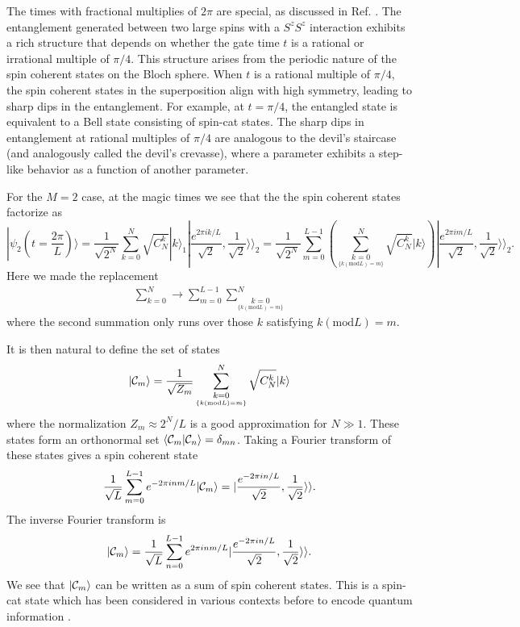 \documentclass{WileyMSP-template}
\begin{document}
The times with fractional multiplies of $ 2 \pi  $ are special, as discussed in Ref. \cite{byrnes2013fractality}.  The entanglement generated between two large spins with a $S^z S^z$ interaction exhibits a rich structure that depends on whether the gate time $t$ is a rational or irrational multiple of $\pi/4$. This structure arises from the periodic nature of the spin coherent states on the Bloch sphere. When $t$ is a rational multiple of $\pi/4$, the spin coherent states in the superposition align with high symmetry, leading to sharp dips in the entanglement. For example, at $t = \pi/4$, the entangled state is equivalent to a Bell state consisting of spin-cat states. The sharp dips in entanglement at rational multiples of $\pi/4$ are analogous to the devil's staircase (and analogously called the devil's crevasse), where a parameter exhibits a step-like behavior as a function of another parameter.  

For the $M = 2 $ case, at the magic times we see that the the spin coherent states factorize as
%
\begin{equation}
|\psi_2 (t= \frac{2\pi}{L} )  \rangle=\frac{1}{\sqrt{2^N}}\sum_{k=0}^N \sqrt{C_{N}^{k}}|k\rangle_1  |\frac{e^{2 \pi i k/L }}{\sqrt{2}},\frac{1}{\sqrt{2}}\rangle\rangle_2  = \frac{1}{\sqrt{2^N}} \sum_{m=0}^{L-1} \left(  \sum^N_{  \underset{  \{ k (\text{mod} L ) =m \} }{k=0} }   \sqrt{C_{N}^{k}}|k\rangle  \right)  |\frac{e^{2 \pi i m/L }}{\sqrt{2}},\frac{1}{\sqrt{2}}\rangle\rangle_2 .
\label{M2psiv2}
\end{equation}
%
Here we made the replacement
%
\begin{align}
\sum_{k=0}^N \rightarrow \sum_{m=0}^{L-1} \sum^N_{  \underset{  \{ k (\text{mod} L ) =m \} }{k=0} }
\end{align}
%
where the second summation only runs over those $ k $ satisfying $ k (\text{mod} L) = m $.

It is then natural to define the set of states
%
\begin{align}
|{\cal C}_m \rangle = \frac{1}{\sqrt{Z_m}}  \sum^N_{  \underset{  \{ k (\text{mod} L ) =m \} }{k=0} }  \sqrt{C_{N}^{k}}|k\rangle
\end{align}
%
where the normalization $ Z_m \approx 2^N/L $ is a good approximation for $ N \gg 1 $.  These states form an orthonormal set $ \langle {\cal C}_m | {\cal C}_n \rangle = \delta_{mn} $. Taking a Fourier transform of these states gives a spin coherent state
%
\begin{align}
\frac{1}{\sqrt{L}} \sum_{m=0}^{L-1} e^{-2 \pi i n m/L } |{\cal C}_m \rangle  =| \frac{e^{-2 \pi i n /L }}{\sqrt{2}}, \frac{1}{\sqrt{2}} \rangle \rangle .
\end{align}
%
The inverse Fourier transform is
%
\begin{align}
|{\cal C}_m \rangle = \frac{1}{\sqrt{L}} \sum_{n=0}^{L-1}
e^{2 \pi i n m/L } | \frac{e^{-2 \pi i n /L }}{\sqrt{2}}, \frac{1}{\sqrt{2}} \rangle \rangle .
\label{invfouriercat}
\end{align}
%
We see that $ |{\cal C}_m \rangle$ can be written as a sum of spin coherent states.  This is a spin-cat state which has been considered in various contexts before to encode quantum information \cite{agarwal1997atomic,semenenko2016implementing,qin2021generating,omanakuttan2024fault}.
\end{document}

